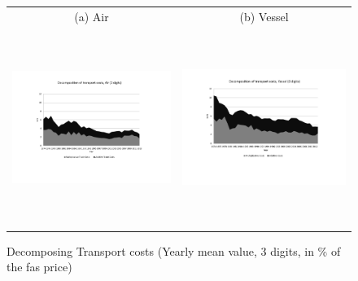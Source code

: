\documentclass[a4paper,11pt]{article}
\begin{document}
\begin{figure}[htbp]
\caption{Decomposing Transport costs (Yearly mean value, 3 digits, in \% of the fas price)}
\label{fig:decomp_TC_3d}
\begin{center}
\begin{tabular}{cc}
{\small (a) Air } & {\small (b) Vessel}\\
\includegraphics[width=3in, height=2.5in]{Fig2a_decompTC_air_3d.pdf}
& \includegraphics[width=3in,height=2.5in]{Fig2b_decompTC_vessel_3d.pdf} \\
\end{tabular}
\end{center}
\end{figure}

\end{document}
